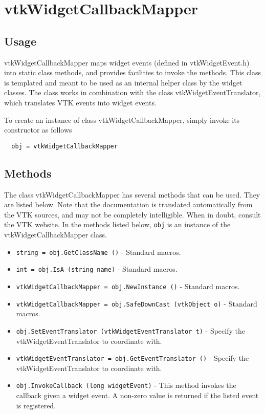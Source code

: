 \section{vtkWidgetCallbackMapper}

\subsection{Usage}

 vtkWidgetCallbackMapper maps widget events (defined in vtkWidgetEvent.h)
 into static class methods, and provides facilities to invoke the methods.
 This class is templated and meant to be used as an internal helper class
 by the widget classes. The class works in combination with the class
 vtkWidgetEventTranslator, which translates VTK events into widget events.


To create an instance of class vtkWidgetCallbackMapper, simply
invoke its constructor as follows
\begin{verbatim}
  obj = vtkWidgetCallbackMapper
\end{verbatim}
\subsection{Methods}

The class vtkWidgetCallbackMapper has several methods that can be used.
  They are listed below.
Note that the documentation is translated automatically from the VTK sources,
and may not be completely intelligible.  When in doubt, consult the VTK website.
In the methods listed below, \verb|obj| is an instance of the vtkWidgetCallbackMapper class.
\begin{itemize}
\item  \verb|string = obj.GetClassName ()| -  Standard macros.

\item  \verb|int = obj.IsA (string name)| -  Standard macros.

\item  \verb|vtkWidgetCallbackMapper = obj.NewInstance ()| -  Standard macros.

\item  \verb|vtkWidgetCallbackMapper = obj.SafeDownCast (vtkObject o)| -  Standard macros.

\item  \verb|obj.SetEventTranslator (vtkWidgetEventTranslator t)| -  Specify the vtkWidgetEventTranslator to coordinate with.

\item  \verb|vtkWidgetEventTranslator = obj.GetEventTranslator ()| -  Specify the vtkWidgetEventTranslator to coordinate with.

\item  \verb|obj.InvokeCallback (long widgetEvent)| -  This method invokes the callback given a widget event. A non-zero value
 is returned if the listed event is registered.

\end{itemize}
